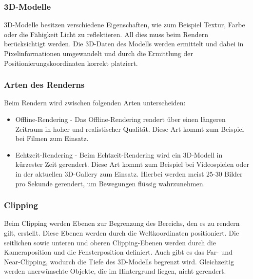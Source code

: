 \subsubsection{3D-Modelle}
3D-Modelle besitzen verschiedene Eigenschaften, wie zum Beispiel Textur, Farbe oder die Fähigkeit Licht zu reflektieren. All dies muss beim Rendern berücksichtigt werden. Die 3D-Daten des Modells werden ermittelt und dabei in Pixelinformationen umgewandelt und durch die Ermittlung der Positionierungskoordinaten korrekt platziert.\cite{Rendering3DModels}

\subsubsection{Arten des Renderns}
Beim Rendern wird zwischen folgenden Arten unterscheiden:

\begin{itemize}
    \item Offline-Rendering - Das Offline-Rendering rendert über einen längeren Zeitraum in hoher und realistischer Qualität. Diese Art kommt zum Beispiel bei Filmen zum Einsatz. \cite{RenderArten}
    \item Echtzeit-Rendering - Beim Echtzeit-Rendering wird ein 3D-Modell in kürzester Zeit gerendert. Diese Art kommt zum Beispiel bei Videospielen oder in der aktuellen 3D-Gallery zum Einsatz. Hierbei werden meist 25-30 Bilder pro Sekunde gerendert, um Bewegungen flüssig wahrzunehmen. \cite{RenderArten}
\end{itemize}


\subsubsection{Clipping}
\label{clipping}
Beim Clipping werden Ebenen zur Begrenzung des Bereichs, den es zu rendern gilt, erstellt. Diese Ebenen werden durch die Weltkoordinaten positioniert. Die seitlichen sowie unteren und oberen Clipping-Ebenen werden durch die Kameraposition und die Fensterposition definiert. Auch gibt es das Far- und Near-Clipping, wodurch die Tiefe des 3D-Modells begrenzt wird. Gleichzeitig werden unerwünschte Objekte, die im Hintergrund liegen, nicht gerendert. \cite{Rendering3DModels}


